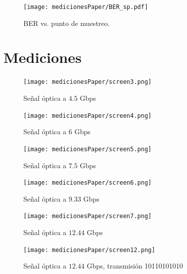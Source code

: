 \documentclass[12pt,twoside,openright]{moddalthesis}
\begin{document}
\begin{figure}[t]
  \centering
    \texttt{[image: medicionesPaper/BER\_sp.pdf]}
\caption {BER vs. punto de muestreo.}
\label{fig:BER}
\end{figure}
\section{Mediciones}
\begin{figure}[!t]
  \centering
  \texttt{[image: medicionesPaper/screen3.png]}
  \caption {Señal óptica a $4.5$ Gbps}
  \label{fig:Img1}
\end{figure}

\begin{figure}[!t]
  \centering
 \texttt{[image: medicionesPaper/screen4.png]}
  \caption {Señal óptica a $6$ Gbps}
  \label{fig:Img2}
\end{figure}

\begin{figure}[!t]
  \centering
 \texttt{[image: medicionesPaper/screen5.png]}
  \caption {Señal óptica a $7.5$ Gbps}
  \label{fig:Img3}
\end{figure}


\begin{figure}[!t]
  \centering
 \texttt{[image: medicionesPaper/screen6.png]}
  \caption {Señal óptica a $9.33$ Gbps}
  \label{fig:Img4}
\end{figure}


\begin{figure}[!t]
  \centering
 \texttt{[image: medicionesPaper/screen7.png]}
  \caption {Señal óptica a $12.44$ Gbps}
  \label{fig:Img5}
\end{figure}



\begin{figure}[!t]
  \centering
  \texttt{[image: medicionesPaper/screen12.png]}
  \caption {Señal óptica a $12.44$ Gbps, transmisión 10110101010}
  \label{fig:Img6}
\end{figure}
\end{document}
